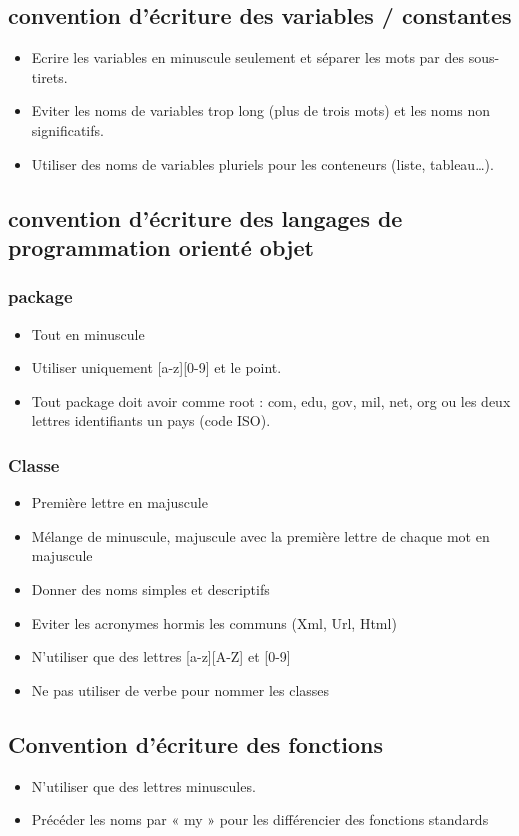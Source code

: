 \documentclass[11pt,fleqn]{book} %
\begin{document}
\subsection{convention d’écriture des variables / constantes}
\begin{itemize}
    \item Ecrire les variables en minuscule seulement et séparer les mots par des sous-tirets.
    \item Eviter les noms de variables trop long (plus de trois mots) et les noms non significatifs.
    \item Utiliser des noms de variables pluriels pour les conteneurs (liste, tableau…). 
\end{itemize}
\subsection{convention d’écriture des langages de 
programmation orienté objet }
\subsubsection{package}
\begin{itemize}
    \item Tout en minuscule
    \item Utiliser uniquement [a-z][0-9] et le point.
    \item Tout package doit avoir comme root : com, edu, gov, mil, net, org ou les deux lettres identifiants un pays (code ISO).
\end{itemize}
\subsubsection{Classe}
\begin{itemize}
    \item Première lettre en majuscule
    \item Mélange de minuscule, majuscule avec la première lettre de chaque mot en majuscule
    \item Donner des noms simples et descriptifs
    \item Eviter les acronymes hormis les communs (Xml, Url, Html)
    \item N'utiliser que des lettres [a-z][A-Z] et [0-9]
    \item Ne pas utiliser de verbe pour nommer les classes
\end{itemize}
\subsection{Convention d’écriture des fonctions}
\begin{itemize}
    \item N’utiliser que des lettres minuscules.
    \item Précéder les noms par « my » pour les différencier des fonctions standards
\end{itemize}
\end{document}
